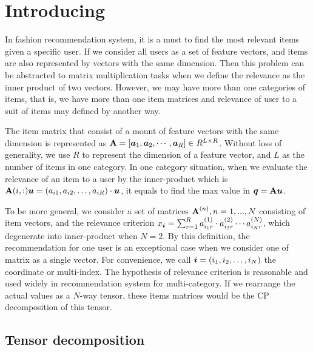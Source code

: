 \documentclass{article}
\newcommand{\Sca}[3]{{#1}^{(#2)}_{i_#2#3}}%
\newcommand{\V}[1]{{\bm{{\MakeLowercase{#1}}}}}
\newcommand{\M}[1]{{\bm{\mathbf{\MakeUppercase{#1}}}}}
\begin{document}
\title{}
\date{}
\author{}
\maketitle



\section{Introducing}

In fashion recommendation system, it is a must to find the most relevant items given a specific user. If we consider all users as a set of feature vectors, and items are also represented by vectors with the same dimension. Then this problem can be abstracted to matrix multiplication tasks when we define the relevance as the inner product of two vectors. However, we may have more than one categories of items, that is, we have more than one item matrices and relevance of user to a suit of items may defined by another way. 

The item matrix that consist of a mount of feature vectors with the same dimension is represented as $\M{A} =
[\V{a}_{1},\V{a}_{2},\cdots,\V{a}_{R}]\in R^{L\times R}$.  Without loss of generality, we use $R$ to represent the dimension of a feature vector, and $L$ as the number of items in one category. In one category situation, when we evaluate the relevance of an item to a user by the inner-product which is $\M{A}(i,:)\V{u}=(a_{i1},a_{i2},\ldots,a_{iR})\cdot\V{u}$, it equals to find the max value in $\V{q} = \M{a}\V{u}$. 

To be more general, we consider a set of matrices $\M{A}^{(n)},n = 1,...,N$ consisting of item vectors, and the relevance criterion $x_\V{i} = \sum_{r=1}^{R}\Sca{a}{1}{r}\cdot\Sca{a}{2}{r}\cdots\Sca{a}{N}{r}$, which degenerate into inner-product when $N=2$. By this definition, the recommendation for one user is an exceptional case when we consider one of matrix as a single vector. For convenience, we call $\V{i} = (i_1,i_2,\ldots,i_N)$ the coordinate or multi-index. The hypothesis of relevance criterion is reasonable and used widely in recommendation system for multi-category. If we rearrange the actual values as a $N$-way tensor, these items matrices would be the CP decomposition of this tensor.

\subsection{Tensor decomposition}
\end{document}
